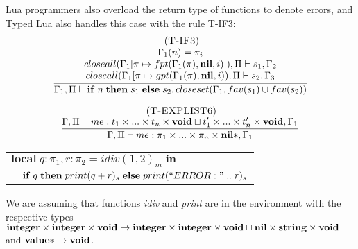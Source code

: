 Lua programmers also overload the return type of functions to denote
errors, and Typed Lua also handles this case with the rule \textsc{T-IF3}:
\[
\begin{array}{c}
\; (\textsc{T-IF3})\\
\dfrac{\begin{array}{c}
       \Gamma_{1}(n) = \pi_{i}\\
       closeall(\Gamma_{1}[\pi \mapsto fpt(\Gamma_{1}(\pi), \mathbf{nil}, i)]), \Pi \vdash s_{1}, \Gamma_{2} \\
       closeall(\Gamma_{1}[\pi \mapsto gpt(\Gamma_{1}(\pi), \mathbf{nil}, i)), \Pi \vdash s_{2}, \Gamma_{3}
      \end{array}}
      {\Gamma_{1}, \Pi \vdash \mathbf{if} \; n \; \mathbf{then} \; s_{1} \; \mathbf{else} \; s_{2}, closeset(\Gamma_{1}, fav(s_{1}) \cup fav(s_{2}))}
\end{array}
\]

\[
\begin{array}{c}
\; (\textsc{T-EXPLIST6})\\
\dfrac{\Gamma, \Pi \vdash me:t_{1} \times ... \times t_{n} \times \mathbf{void} \sqcup t_{1}' \times ... \times t_{n}' \times \mathbf{void}, \Gamma_{1}}
      {\Gamma, \Pi \vdash me:\pi_{1} \times ... \times \pi_{n} \times \mathbf{nil}{*}, \Gamma_{1}}
\end{array}
\]

\begin{center}
\begin{tabular}{ll}
\multicolumn{2}{l}{$\mathbf{local} \; q:\pi_{1}, r:\pi_{2} = idiv(1, 2)_{m} \; \mathbf{in}$}\\
& \multicolumn{1}{l}{$\mathbf{if} \; q \; \mathbf{then} \; print(q + r)_{s} \; \mathbf{else} \; print(``ERROR: " \; .. \; r)_{s}$}
\end{tabular}
\end{center}

We are assuming that functions \emph{idiv} and \emph{print} are in
the environment with the respective types
$\mathbf{integer} \times \mathbf{integer} \times \mathbf{void} \rightarrow \mathbf{integer} \times \mathbf{integer} \times \mathbf{void} \sqcup \mathbf{nil} \times \mathbf{string} \times \mathbf{void}$
and
$\mathbf{value}{*} \rightarrow \mathbf{void}$.

